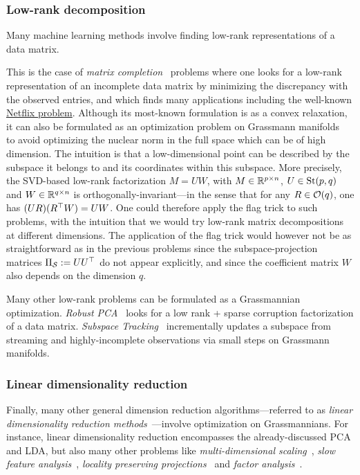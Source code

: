 \subsubsection{Low-rank decomposition}
Many machine learning methods involve finding low-rank representations of a data matrix. 

This is the case of \textit{matrix completion}~\citep{candes_exact_2012} problems where one looks for a low-rank representation of an incomplete data matrix by minimizing the discrepancy with the observed entries, and which finds many applications including the well-known \href{https://en.wikipedia.org/wiki/Netflix_Prize}{Netflix problem}. Although its most-known formulation is as a convex relaxation, it can also be formulated as an optimization problem on Grassmann manifolds~\citep{keshavan_matrix_2010,boumal_rtrmc_2011} to avoid optimizing the nuclear norm in the full space which can be of high dimension. The intuition is that a low-dimensional point can be described by the subspace it belongs to and its coordinates within this subspace. More precisely, the SVD-based low-rank factorization $M = UW$, with $M \in \mathbb{R}^{p \times n}$, $U \in \operatorname{St}(p, q)$ and $W \in \mathbb{R}^{q \times n}$ is orthogonally-invariant---in the sense that for any $R\in\mathcal{O}(q)$, one has $(UR) (R^\top W) = U W$. One could therefore apply the flag trick to such problems, with the intuition that we would try low-rank matrix decompositions at different dimensions. The application of the flag trick would however not be as straightforward as in the previous problems since the subspace-projection matrices $\Pi_{\mathcal{S}} := U U^\top$ do not appear explicitly, and since the coefficient matrix $W$ also depends on the dimension $q$.

Many other low-rank problems can be formulated as a Grassmannian optimization. \textit{Robust PCA}~\citep{candes_robust_2011} looks for a low rank + sparse corruption factorization of a data matrix. \textit{Subspace Tracking}~\citep{balzano_online_2010} incrementally updates a subspace from streaming and highly-incomplete observations via small steps on Grassmann manifolds.

\subsubsection{Linear dimensionality reduction}
Finally, many other general dimension reduction algorithms---referred to as \textit{linear dimensionality reduction methods}~\citep{cunningham_linear_2015}---involve optimization on Grassmannians. For instance, linear dimensionality reduction encompasses the already-discussed PCA and LDA, but also many other problems like \textit{multi-dimensional scaling}~\citep{torgerson_multidimensional_1952}, \textit{slow feature analysis}~\citep{wiskott_slow_2002}, \textit{locality preserving projections}~\citep{he_locality_2003} and \textit{factor analysis}~\citep{spearman_general_1904}.